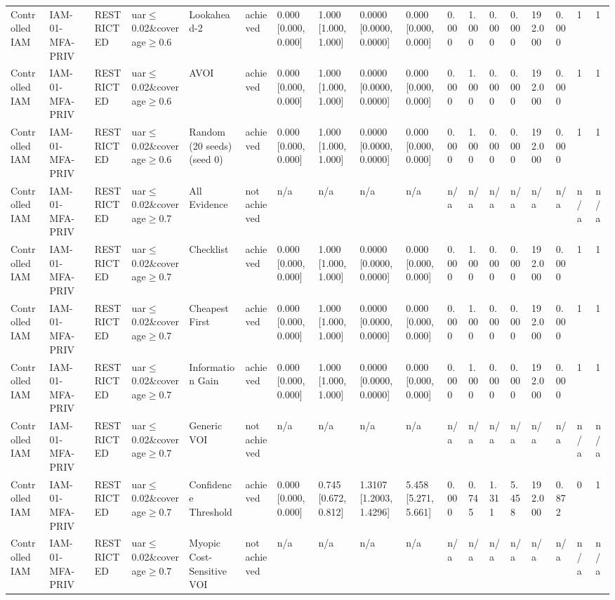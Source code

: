 \begin{table}[!ht]
{\begin{tabular}{llllllllllllllllll}
Controlled IAM & IAM-01-MFA-PRIV & RESTRICTED & uar$\le$0.02\&coverage$\ge$0.6 & Lookahead-2 & achieved & 0.000 [0.000, 0.000] & 1.000 [1.000, 1.000] & 0.0000 [0.0000, 0.0000] & 0.000 [0.000, 0.000] & 0.000 & 1.000 & 0.000 & 0.000 & 192.000 & 0.000 & 1 & 1 \\
Controlled IAM & IAM-01-MFA-PRIV & RESTRICTED & uar$\le$0.02\&coverage$\ge$0.6 & AVOI & achieved & 0.000 [0.000, 0.000] & 1.000 [1.000, 1.000] & 0.0000 [0.0000, 0.0000] & 0.000 [0.000, 0.000] & 0.000 & 1.000 & 0.000 & 0.000 & 192.000 & 0.000 & 1 & 1 \\
Controlled IAM & IAM-01-MFA-PRIV & RESTRICTED & uar$\le$0.02\&coverage$\ge$0.6 & Random (20 seeds) (seed 0) & achieved & 0.000 [0.000, 0.000] & 1.000 [1.000, 1.000] & 0.0000 [0.0000, 0.0000] & 0.000 [0.000, 0.000] & 0.000 & 1.000 & 0.000 & 0.000 & 192.000 & 0.000 & 1 & 1 \\
Controlled IAM & IAM-01-MFA-PRIV & RESTRICTED & uar$\le$0.02\&coverage$\ge$0.7 & All Evidence & not achieved & n/a & n/a & n/a & n/a & n/a & n/a & n/a & n/a & n/a & n/a & n/a & n/a \\
Controlled IAM & IAM-01-MFA-PRIV & RESTRICTED & uar$\le$0.02\&coverage$\ge$0.7 & Checklist & achieved & 0.000 [0.000, 0.000] & 1.000 [1.000, 1.000] & 0.0000 [0.0000, 0.0000] & 0.000 [0.000, 0.000] & 0.000 & 1.000 & 0.000 & 0.000 & 192.000 & 0.000 & 1 & 1 \\
Controlled IAM & IAM-01-MFA-PRIV & RESTRICTED & uar$\le$0.02\&coverage$\ge$0.7 & Cheapest First & achieved & 0.000 [0.000, 0.000] & 1.000 [1.000, 1.000] & 0.0000 [0.0000, 0.0000] & 0.000 [0.000, 0.000] & 0.000 & 1.000 & 0.000 & 0.000 & 192.000 & 0.000 & 1 & 1 \\
Controlled IAM & IAM-01-MFA-PRIV & RESTRICTED & uar$\le$0.02\&coverage$\ge$0.7 & Information Gain & achieved & 0.000 [0.000, 0.000] & 1.000 [1.000, 1.000] & 0.0000 [0.0000, 0.0000] & 0.000 [0.000, 0.000] & 0.000 & 1.000 & 0.000 & 0.000 & 192.000 & 0.000 & 1 & 1 \\
Controlled IAM & IAM-01-MFA-PRIV & RESTRICTED & uar$\le$0.02\&coverage$\ge$0.7 & Generic VOI & not achieved & n/a & n/a & n/a & n/a & n/a & n/a & n/a & n/a & n/a & n/a & n/a & n/a \\
Controlled IAM & IAM-01-MFA-PRIV & RESTRICTED & uar$\le$0.02\&coverage$\ge$0.7 & Confidence Threshold & achieved & 0.000 [0.000, 0.000] & 0.745 [0.672, 0.812] & 1.3107 [1.2003, 1.4296] & 5.458 [5.271, 5.661] & 0.000 & 0.745 & 1.311 & 5.458 & 192.000 & 0.872 & 0 & 1 \\
Controlled IAM & IAM-01-MFA-PRIV & RESTRICTED & uar$\le$0.02\&coverage$\ge$0.7 & Myopic Cost-Sensitive VOI & not achieved & n/a & n/a & n/a & n/a & n/a & n/a & n/a & n/a & n/a & n/a & n/a & n/a \\

\end{tabular}}
\end{table}
